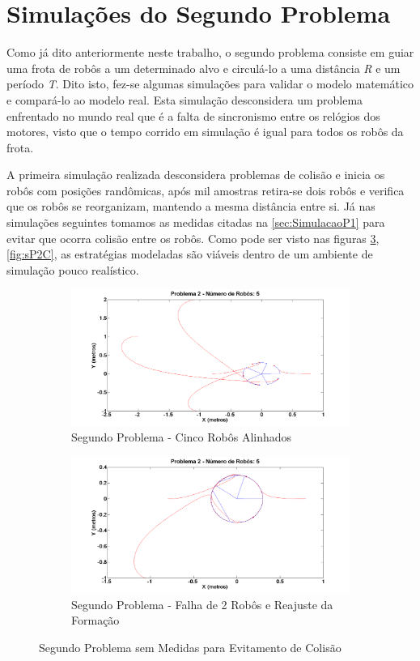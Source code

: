 \section{Simulações do Segundo Problema}
\label{sec:SimulacaoP2}
Como já dito anteriormente neste trabalho, o segundo problema consiste em guiar uma frota de robôs a um determinado alvo e circulá-lo a uma distância \emph{R} e um período \emph{T}. Dito isto, fez-se algumas simulações para validar o modelo matemático e compará-lo ao modelo real. Esta simulação desconsidera um problema enfrentado no mundo real que é a falta de sincronismo entre os relógios dos motores, visto que o tempo corrido em simulação é igual para todos os robôs da frota. 

A primeira simulação realizada desconsidera problemas de colisão e inicia os robôs com posições randômicas, após mil amostras retira-se dois robôs e verifica que os robôs se reorganizam, mantendo a mesma distância entre si. Já nas simulações seguintes tomamos as medidas citadas na \autoref{sec:SimulacaoP1} para evitar que ocorra colisão entre os robôs. Como pode ser visto nas figuras \ref{fig:sP2F}, \ref{fig:sP2C}, as estratégias modeladas são viáveis dentro de um ambiente de simulação pouco realístico. 

\begin{figure}[!htb]
	\centering
	\begin{subfigure}{1.0\textwidth}
		\centering
		\includegraphics[width=.9\linewidth]{./04-figuras/Simulacoes/Problema2/Falha/P2FalhaInicio}
		\caption{Segundo Problema - Cinco Robôs Alinhados}
		\label{fig:P2SF}
	\end{subfigure}
	\begin{subfigure}{1.0\textwidth}
		\centering
		\includegraphics[width=.9\linewidth]{./04-figuras/Simulacoes/Problema2/Falha/P2FalhaFim}
		\caption{Segundo Problema - Falha de 2 Robôs e Reajuste da Formação}
		\label{fig:P2SF2}
	\end{subfigure}
	\caption{Segundo Problema sem Medidas para Evitamento de Colisão}
	\label{fig:sP2F}
\end{figure}

